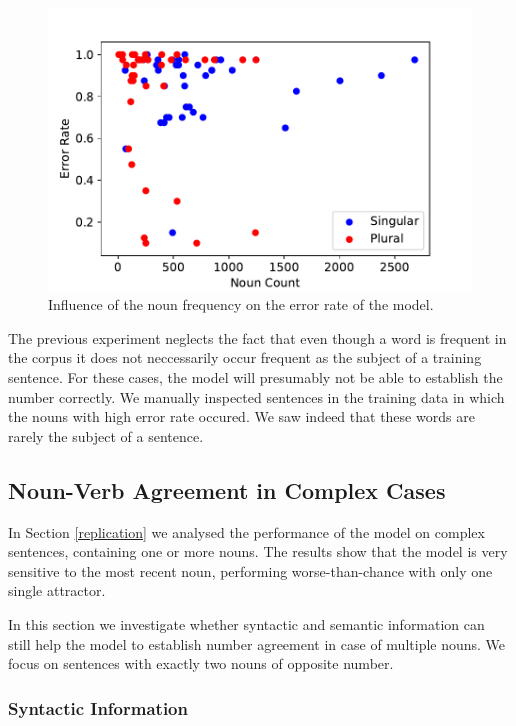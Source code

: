          \begin{figure}
          \centering
        \includegraphics[scale=0.5]{noun_freq_error_rate.pdf}
        \caption{Influence of the noun frequency on the error rate of the model.}
        \label{fig:noun_freq_error}
    \end{figure}
    
    
The previous experiment neglects the fact that even though a word is frequent in the corpus it does not neccessarily occur frequent as the subject of a training sentence. For these cases, the model will presumably not be able to establish the number correctly. We manually inspected sentences in the training data in which
the nouns with high error rate occured. We saw indeed that these words are rarely the subject of a sentence.


\subsection{Noun-Verb Agreement in Complex Cases}

In Section \ref{replication} we analysed the performance of the model
on complex sentences, containing one or more 
nouns.
The results show that the model is very
sensitive to the most recent noun,
performing worse-than-chance with only one single attractor.

In this section we investigate whether
syntactic and semantic information
can still help the model 
to establish number agreement
in case of multiple nouns.
We focus on sentences with exactly two nouns
of opposite number.


\subsubsection{Syntactic Information}

